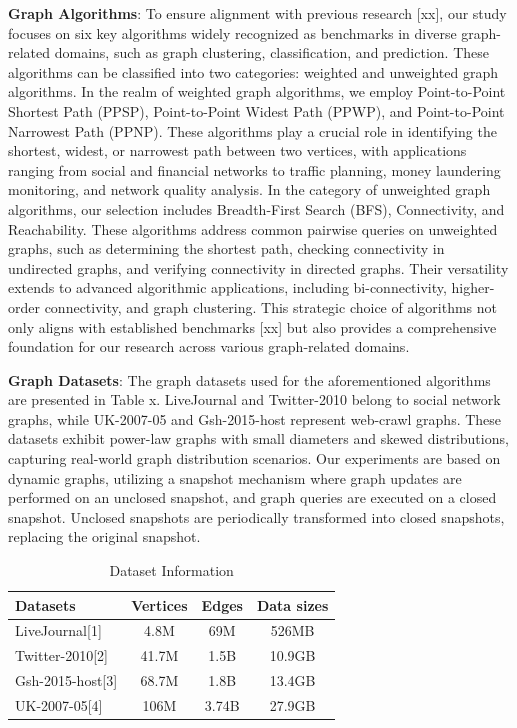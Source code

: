 \documentclass[lettersize,journal]{IEEEtran} %
\begin{document}
{\bf{Graph Algorithms}}: To ensure alignment with previous research [xx], our study focuses on six key algorithms widely recognized as benchmarks in diverse graph-related domains, such as graph clustering, classification, and prediction. These algorithms can be classified into two categories: weighted and unweighted graph algorithms. In the realm of weighted graph algorithms, we employ Point-to-Point Shortest Path (PPSP), Point-to-Point Widest Path (PPWP), and Point-to-Point Narrowest Path (PPNP). These algorithms play a crucial role in identifying the shortest, widest, or narrowest path between two vertices, with applications ranging from social and financial networks to traffic planning, money laundering monitoring, and network quality analysis. In the category of unweighted graph algorithms, our selection includes Breadth-First Search (BFS), Connectivity, and Reachability. These algorithms address common pairwise queries on unweighted graphs, such as determining the shortest path, checking connectivity in undirected graphs, and verifying connectivity in directed graphs. Their versatility extends to advanced algorithmic applications, including bi-connectivity, higher-order connectivity, and graph clustering. This strategic choice of algorithms not only aligns with established benchmarks [xx] but also provides a comprehensive foundation for our research across various graph-related domains.

{\bf{Graph Datasets}}: The graph datasets used for the aforementioned algorithms are presented in Table x. LiveJournal and Twitter-2010 belong to social network graphs, while UK-2007-05 and Gsh-2015-host represent web-crawl graphs. These datasets exhibit power-law graphs with small diameters and skewed distributions, capturing real-world graph distribution scenarios. Our experiments are based on dynamic graphs, utilizing a snapshot mechanism where graph updates are performed on an unclosed snapshot, and graph queries are executed on a closed snapshot. Unclosed snapshots are periodically transformed into closed snapshots, replacing the original snapshot.

\begin{table}[h]
    \centering
    \begin{tabular}{lccc}
    \hline
    Datasets          & Vertices & Edges  & Data sizes \\
    \hline
    LiveJournal[1]    & 4.8M     & 69M    & 526MB      \\
    Twitter-2010[2]   & 41.7M    & 1.5B   & 10.9GB     \\
    Gsh-2015-host[3]  & 68.7M    & 1.8B   & 13.4GB     \\
    UK-2007-05[4]     & 106M     & 3.74B  & 27.9GB     \\
    \hline
    \end{tabular}
    \caption{Dataset Information}
    \end{table}
\end{document}
